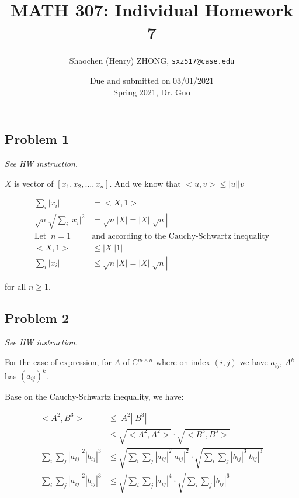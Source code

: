 \documentclass[11pt]{article}
\newcommand{\ilc}{\texttt}
\providecommand{\len}[1]{\left| #1 \right|}
\begin{document}
\title{\textbf{MATH 307: Individual Homework 7}}


\author{Shaochen (Henry) ZHONG, \ilc{sxz517@case.edu}}

\date{Due and submitted on 03/01/2021 \\ Spring 2021, Dr. Guo}
\maketitle



\subsection*{Problem 1}
\textit{See HW instruction.}\newline

$X$ is vector of $[x_1, x_2, \dots, x_n]$. And we know that $<u, v> \leq |u||v|$

\begin{align*}
    \sum_{i} \len{x_i} &= <X, 1> \\
    \sqrt{n} \sqrt{\sum_{i} \len{x_i}^2} &= \sqrt{n} \len{X} = \len{X} \len{\sqrt{n}} \\
    \text{Let } \ n = 1 \ &\text{and according to the Cauchy-Schwartz inequality} \\
    <X, 1> &\leq \len{X} \len{1} \\
    \sum_{i} \len{x_i} &\leq \sqrt{n} \len{X} = \len{X} \len{\sqrt{n}}
\end{align*}

for all $n \geq 1$.

\subsection*{Problem 2}
\textit{See HW instruction.}\newline

For the ease of expression, for $A$ of $\mathbb{C}^{m \times n}$ where on index $(i, j)$ we have $a_{ij}$, $A^k$ has $(a_{ij})^k$.

Base on the Cauchy-Schwartz inequality, we have:

\begin{align*}
    <A^2, B^3> &\leq |A^2||B^3| \\
    &\leq \sqrt{<A^2, A^2>} \cdot \sqrt{<B^3, B^3>} \\
    \sum_i \sum_j \len{a_{ij}}^2 \len{b_{ij}}^3 &\leq \sqrt{\sum_i \sum_j \len{a_{ij}}^2 \len{a_{ij}}^2} \cdot \sqrt{\sum_i \sum_j \len{b_{ij}}^3 \len{b_{ij}}^3} \\
    \sum_i \sum_j \len{a_{ij}}^2 \len{b_{ij}}^3 &\leq \sqrt{\sum_i \sum_j \len{a_{ij}}^4} \cdot \sqrt{\sum_i \sum_j \len{b_{ij}}^6}
\end{align*}
\end{document}

